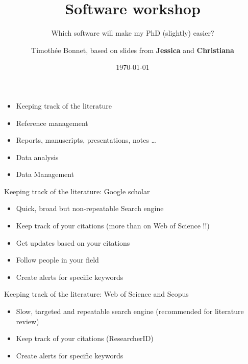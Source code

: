 \documentclass[10pt]{beamer}%
\title[Software workshop]{Software workshop}
\subtitle{Which software will make my PhD (slightly) easier?}
\date{\today}
\author[EE PhD retreat 2019]{Timoth\'ee Bonnet, based on slides from \textbf{Jessica} and \textbf{Christiana}}
\begin{document}
\begin{frame}
\maketitle
\end{frame}

\begin{frame}{}
    \begin{itemize}
    \item Keeping track of the literature
    \item Reference management
    \item Reports, manuscripts, presentations, notes \dots
    \item Data analysis
    \item Data Management
        \end{itemize}

\end{frame}

\begin{frame}{Keeping track of the literature: Google scholar}

    \begin{itemize}
   \item Quick, broad but non-repeatable Search engine
   \item Keep track of your citations (more than on Web of Science !!)
   \item Get updates based on your citations
   \item Follow people in your field
   \item Create alerts for specific keywords
 \end{itemize}

\end{frame}

\begin{frame}{Keeping track of the literature: Web of Science and Scopus}

    \begin{itemize}
   \item Slow, targeted and repeatable search engine (recommended for literature review)
    \item Keep track of your citations (ResearcherID)
    \item Create alerts for specific keywords
 \end{itemize}

\end{frame}
\end{document}
